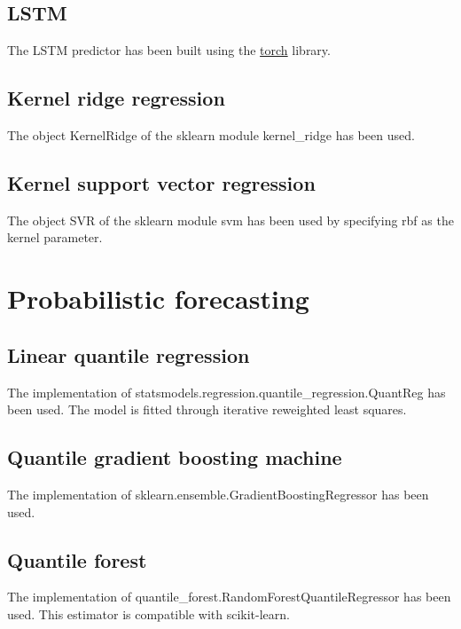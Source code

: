 \subsection{LSTM}
The LSTM predictor has been built using the \href{https://pytorch.org}{torch} library.

\subsection{Kernel ridge regression}
The object KernelRidge of the sklearn module kernel\_ridge has been used.

\subsection{Kernel support vector regression}
The object SVR of the sklearn module svm has been used by specifying rbf as the kernel parameter.

\section{Probabilistic forecasting}
\subsection{Linear quantile regression}
The implementation of statsmodels.regression.quantile\_regression.QuantReg has been used.
The model is fitted through iterative reweighted least squares.
\subsection{Quantile gradient boosting machine}
The implementation of sklearn.ensemble.GradientBoostingRegressor has been used.
\subsection{Quantile forest}
The implementation of quantile\_forest.RandomForestQuantileRegressor has been used. This estimator is compatible with scikit-learn.
